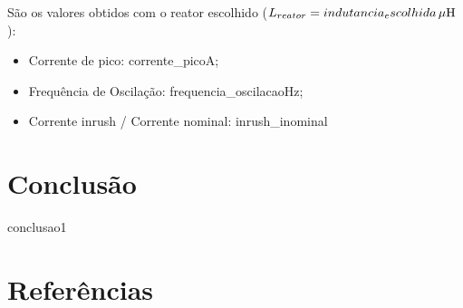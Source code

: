 \documentclass[a4paper]{article}
\begin{document}
São os valores obtidos com o reator escolhido ($L_{reator} = {{indutancia_escolhida}} \, \mu \rm{H} $):
\begin{itemize}[label=\textendash]
	\item	Corrente de pico: {{corrente_pico}}A;
	\item	Frequência de Oscilação: {{frequencia_oscilacao}}Hz;
	\item	Corrente inrush / Corrente nominal: {{inrush_inominal}}
\end{itemize}

\section{Conclusão}
{{conclusao1}}

\section{Referências}
\end{document}
